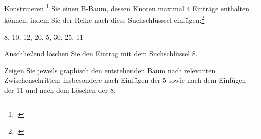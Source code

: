 \documentclass{lehramt-informatik-aufgabe}
\begin{document}

Konstruieren
\footcite{examen:66116:2017:03} Sie einen B-Baum, dessen Knoten maximal $4$ Einträge
enthalten können, indem Sie der Reihe nach diese Suchschlüsssel
einfügen:\footcite[Aufgabe 3]{aud:ab:5}

\begin{center}
8, 10, 12, 20, 5, 30, 25, 11
\end{center}

\noindent
Anschließend löschen Sie den Eintrag mit dem Suchschlüssel $8$.

Zeigen Sie jeweils graphisch den entstehenden Baum nach relevanten
Zwischenschritten; insbesondere nach Einfügen der $5$ sowie nach dem
Einfügen der $11$ und nach dem Löschen der $8$.
\end{document}

